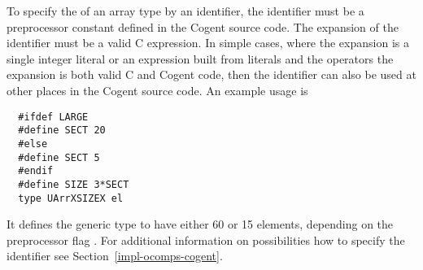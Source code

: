 To specify the  of an array type by an identifier, the identifier must be a preprocessor constant
defined in the Cogent source code. The expansion of the identifier must be a valid C expression. In simple cases,
where the expansion is a single integer literal or an expression built from literals and the operators \code{+ - * /}
the expansion is both valid C and Cogent code, then the identifier can also be used at other places in the Cogent
source code. An example usage is
\begin{verbatim}
  #ifdef LARGE
  #define SECT 20
  #else 
  #define SECT 5
  #endif
  #define SIZE 3*SECT
  type UArrXSIZEX el
\end{verbatim}
It defines the generic type  to have either 60 or 15 elements, depending on the preprocessor flag .
For additional information on possibilities how to specify the identifier see Section~\ref{impl-ocomps-cogent}.

